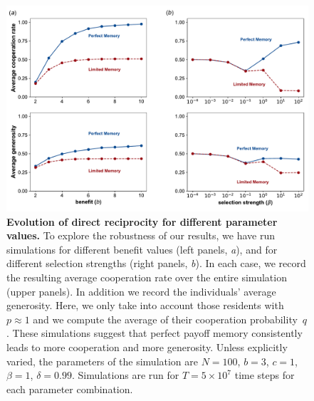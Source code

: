 \documentclass[11pt]{article}
\theoremstyle{plainCl1}
\theoremstyle{plainCl2}
\begin{document}
{\clearpage
\newpage


\begin{figure}[t]
    \centering
    \includegraphics[width=.75\textwidth]{static/cooperation_rate_over_b_and_beta.pdf}
    \caption{{\bf Evolution of direct reciprocity for different parameter values.} 
    To explore the robustness of our results, we have run simulations for different benefit values (left panels, {\it a}), and for different selection strengths (right panels, {\it b}). 
    In each case, we record the resulting average cooperation rate over the entire simulation (upper panels). 
    In addition we record the individuals' average generosity. 
    Here, we only take into account those residents with $p\! \approx\! 1$ and we compute
    the average of their cooperation probability~$q$. 
    These simulations suggest that perfect payoff memory consistently leads to more cooperation and more generosity. 
    Unless explicitly varied, the parameters of the simulation are $N\!=\!100$, $b\!=\!3$, $c\!=\!1$, $\beta\!=\!1$, $\delta\!=\!0.99$. 
    Simulations are run for $T\!=\!5\times 10^7$ time steps for each parameter combination.}
    \label{fig:cooperation_rate_over_benefit_and_beta}
\end{figure}

\clearpage
\newpage

}
\end{document}
